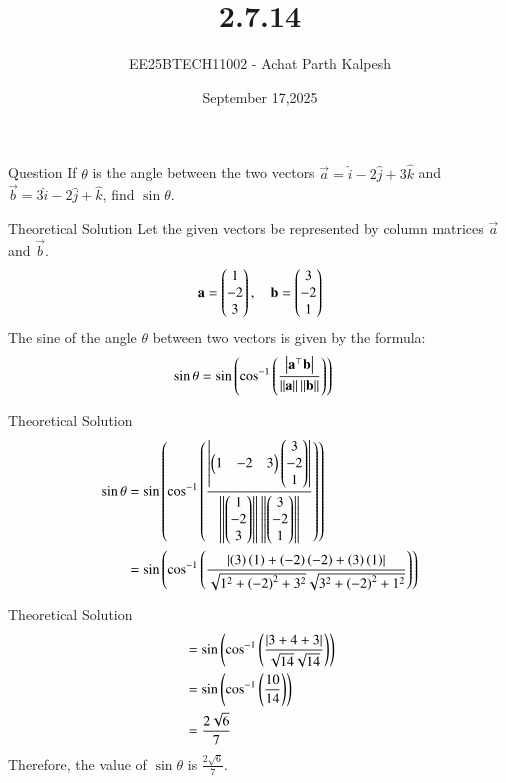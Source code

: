 \documentclass{beamer}
\title %
{2.7.14}
\date{September 17,2025}
\author %
{EE25BTECH11002 - Achat Parth Kalpesh}
\begin{document}
\frame{\titlepage}

\begin{frame}{Question}
If $\theta$ is the angle between the two vectors $\vec{a} = \hat{i} - 2\hat{j} + 3\hat{k}$ and $\vec{b} = 3\hat{i} - 2\hat{j} + \hat{k}$, find $\sin \theta$.
\end{frame}

\begin{frame}{Theoretical Solution}
Let the given vectors be represented by column matrices $\vec{a}$ and $\vec{b}$.
\begin{align}
    \mathbf{a} = \begin{pmatrix}1 \\ -2 \\ 3\end{pmatrix}, \quad \mathbf{b} = \begin{pmatrix}3 \\ -2 \\ 1\end{pmatrix}
\end{align}
The sine of the angle $\theta$ between two vectors is given by the formula:
\begin{align}
\sin\theta &= \sin\left(\cos^{-1}\left(\frac{\left\vert\mathbf{a}^\top\mathbf{b}\right\vert}{\left\lVert\mathbf{a}\right\rVert \left\lVert\mathbf{b}\right\rVert}\right)\right)
\end{align}
\end{frame}

\begin{frame}{Theoretical Solution}
\begin{align}
  \sin\theta &= \sin\left(\cos^{-1}\left(\frac{\left\vert\begin{pmatrix}1&-2&3\end{pmatrix}\begin{pmatrix}3\\-2\\1\end{pmatrix}\right\vert}{\left\lVert\begin{pmatrix}1\\-2\\3\end{pmatrix}\right\rVert\left\lVert\begin{pmatrix}3\\-2\\1\end{pmatrix}\right\rVert}\right)\right)\\
  &= \sin\left(\cos^{-1} \left(\frac{\left\vert\left(3\right)\left(1\right) + \left(-2\right)\left(-2\right) + \left(3\right)\left(1\right)\right\vert}{\sqrt{1^2 + \left(-2\right)^2 + 3^2}\sqrt{3^2 + \left(-2\right)^2 + 1^2}}\right)\right)
\end{align}
\end{frame}

\begin{frame}{Theoretical Solution}
\begin{align}
   &= \sin\left(\cos^{-1}\left(\frac{\left\vert3+4+3\right\vert}{\sqrt{14}\sqrt{14}}\right)\right)\\
    &= \sin\left(\cos^{-1}\left(\frac{10}{14}\right)\right)\\
    &= \frac{2\sqrt{6}}{7}
\end{align}
Therefore, the value of $\sin \theta$ is $\frac{2\sqrt{6}}{7}$.
\end{frame}
\end{document}
